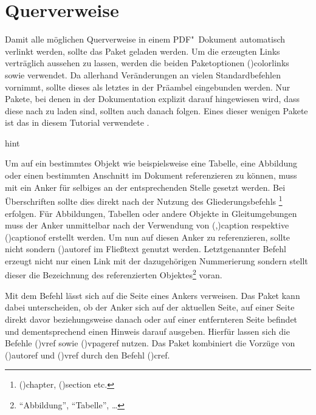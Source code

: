 \documentclass[%
  english,ngerman,%
  cdgeometry=no,DIV=12,%
  cd=false,cdfont=false,cdtitle=true,%
  headings=normal,%
  automark,%
  listof=toc,%
]{tudscrartcl}
\begin{document}
\section{%
  Querverweise%
  \label{sec:references}%
}

Damit alle möglichen Querverweise in einem PDF"~Dokument automatisch verlinkt 
werden, sollte das Paket  geladen werden. Um die erzeugten 
Links verträglich aussehen zu lassen, werden die beiden Paketoptionen 
\Option(){colorlinks} sowie  
verwendet. Da  allerhand Veränderungen an vielen 
Standardbefehlen vornimmt, sollte dieses als letztes in der Präambel 
eingebunden werden. Nur Pakete, bei denen in der Dokumentation explizit darauf 
hingewiesen wird, dass diese nach  zu laden sind, sollten 
auch danach folgen. Eines dieser wenigen Pakete ist das in diesem Tutorial 
verwendete . 
%
\begin{Code}{hint}
\usepackage[colorlinks,linkcolor=blue]{hyperref}

\end{Code}

Um auf ein bestimmtes Objekt wie beispielsweise eine Tabelle, eine Abbildung 
oder einen bestimmten Anschnitt im Dokument referenzieren zu können, muss mit 
 ein Anker für selbiges an der entsprechenden 
Stelle gesetzt werden. Bei Überschriften sollte dies direkt nach der Nutzung 
des Gliederungsbefehls%
\footnote{%
  \Macro(){chapter}, 
  \Macro(){section} etc.%
}
erfolgen. Für Abbildungen, Tabellen oder andere Objekte in Gleitumgebungen 
muss der Anker unmittelbar nach der Verwendung von 
\Macro(,){caption} respektive 
\Macro(){captionof} erstellt werden. Um nun auf diesen 
Anker zu referenzieren, sollte nicht  sondern 
\Macro(){autoref} im Fließtext genutzt werden. Letztgenannter 
Befehl erzeugt nicht nur einen Link mit der dazugehörigen Nummerierung sondern 
stellt dieser die Bezeichnung des referenzierten 
Objektes\footnote{\enquote{Abbildung}, \enquote{Tabelle}, \dots} voran. 

Mit dem Befehl  lässt sich auf die Seite eines Ankers verweisen.
Das Paket  kann dabei unterscheiden, ob der Anker sich auf 
der aktuellen Seite, auf einer Seite direkt davor beziehungsweise danach oder 
auf einer entfernteren Seite befindet und dementsprechend einen Hinweis darauf 
ausgeben. Hierfür lassen sich die Befehle \Macro(){vref} 
sowie \Macro(){vpageref} nutzen. Das Paket  
kombiniert die Vorzüge von \Macro(){autoref} und 
\Macro(){vref} durch den Befehl 
\Macro(){cref}.
\end{document}
